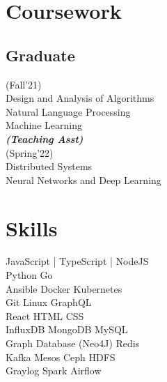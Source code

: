 \documentclass[]{deedy-resume-openfont}
\begin{document}
\begin{minipage}[t]{0.33\textwidth}
\section{Coursework}
\subsection{Graduate}
(Fall'21)\\
\textbullet{} Design and Analysis of Algorithms \\
\textbullet{} Natural Language Processing \\
\textbullet{} Machine Learning \\
{\footnotesize \textit{\textbf{(Teaching Asst) }}}
\\(Spring'22)\\
\textbullet{} Distributed Systems \\
\textbullet{} Neural Networks and Deep Learning \\
\sectionsep


\section{Skills}
\textbullet{} JavaScript | TypeScript | NodeJS \\
\textbullet{} Python \textbullet{} Go  \\

\textbullet{} Ansible \textbullet{} Docker \textbullet{} Kubernetes \\
\textbullet{} Git \textbullet{} Linux \textbullet{} GraphQL \\
\textbullet{} React \textbullet{} HTML \textbullet{} CSS \\
\textbullet{} InfluxDB \textbullet{} MongoDB \textbullet{} MySQL \\
\textbullet{} Graph Database (Neo4J) \textbullet{} Redis \\
\textbullet{} Kafka \textbullet{} Mesos \textbullet{} Ceph \textbullet{} HDFS \\
\textbullet{} Graylog \textbullet{} Spark \textbullet{} Airflow \\
\sectionsep

%
%

\end{minipage} 
\end{document}
